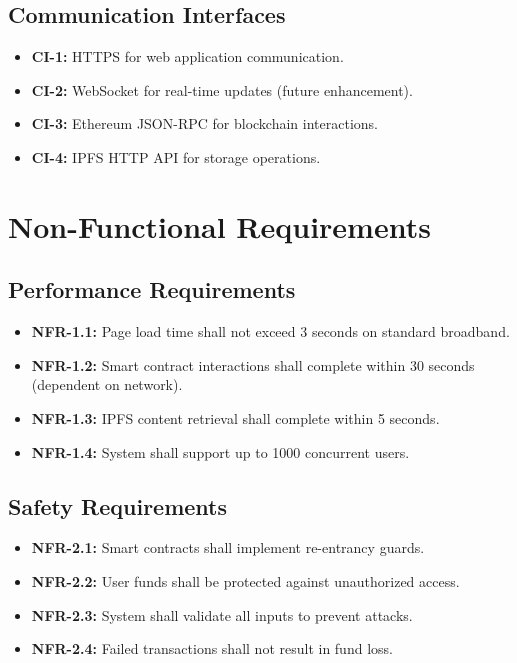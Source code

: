 \subsection{Communication Interfaces}

\begin{itemize}
    \item \textbf{CI-1:} HTTPS for web application communication.
    \item \textbf{CI-2:} WebSocket for real-time updates (future enhancement).
    \item \textbf{CI-3:} Ethereum JSON-RPC for blockchain interactions.
    \item \textbf{CI-4:} IPFS HTTP API for storage operations.
\end{itemize}

\section{Non-Functional Requirements}

\subsection{Performance Requirements}

\begin{itemize}
    \item \textbf{NFR-1.1:} Page load time shall not exceed 3 seconds on standard broadband.
    \item \textbf{NFR-1.2:} Smart contract interactions shall complete within 30 seconds (dependent on network).
    \item \textbf{NFR-1.3:} IPFS content retrieval shall complete within 5 seconds.
    \item \textbf{NFR-1.4:} System shall support up to 1000 concurrent users.
\end{itemize}

\subsection{Safety Requirements}

\begin{itemize}
    \item \textbf{NFR-2.1:} Smart contracts shall implement re-entrancy guards.
    \item \textbf{NFR-2.2:} User funds shall be protected against unauthorized access.
    \item \textbf{NFR-2.3:} System shall validate all inputs to prevent attacks.
    \item \textbf{NFR-2.4:} Failed transactions shall not result in fund loss.
\end{itemize}

